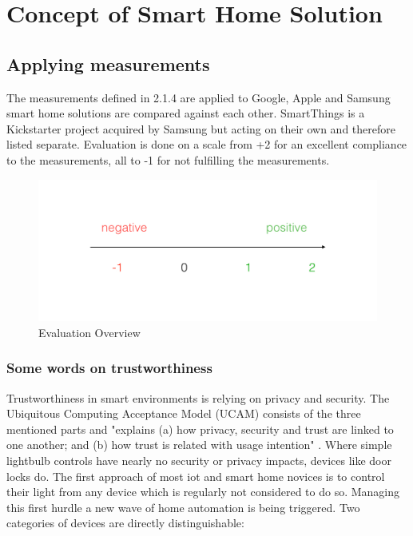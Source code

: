 \section{Concept of Smart Home Solution}\label{concept} %

	\subsection{Applying measurements}
		The measurements defined in 2.1.4 are applied to Google, Apple and Samsung smart home solutions are compared against each other. SmartThings is a Kickstarter project acquired by Samsung but acting on their own and therefore listed separate. Evaluation is done on a scale from +2 for an excellent compliance to the measurements, all to -1 for not fulfilling the measurements.

		\begin{figure}[h]
			\centering
				\includegraphics[width=.9\textwidth]{images/praxis/Evaluation.jpg}
			\caption{Evaluation Overview}
			\label{fig:SmartHomeLandscape}
		\end{figure}

		\subsubsection{Some words on trustworthiness}
			Trustworthiness in smart environments is relying on privacy and security. The Ubiquitous Computing Acceptance Model (UCAM) consists of the three mentioned parts and "explains (a) how privacy, security and trust are linked to one another; and (b) how trust is related with usage intention" \parencite{SmartTrust}. Where simple lightbulb controls have nearly no security or privacy impacts, devices like door locks do. The first approach of most iot and smart home novices is to control their light from any device which is regularly not considered to do so. Managing this first hurdle a new wave of home automation is being triggered. Two categories of devices are directly distinguishable:

